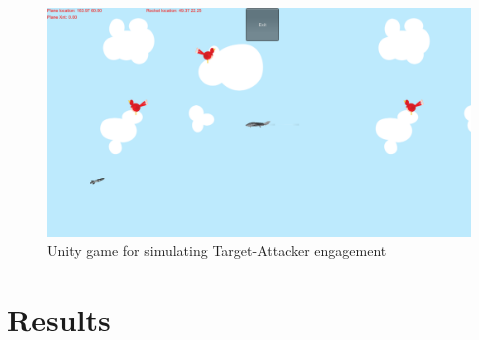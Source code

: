  \begin{figure}[H]
 	\centering
 	\includegraphics[scale = 0.35]{fig/unityGame.PNG}
 	\caption{Unity game for simulating Target-Attacker engagement}
 	\label{UnityGame}
 \end{figure}
 

 
\section{Results}

